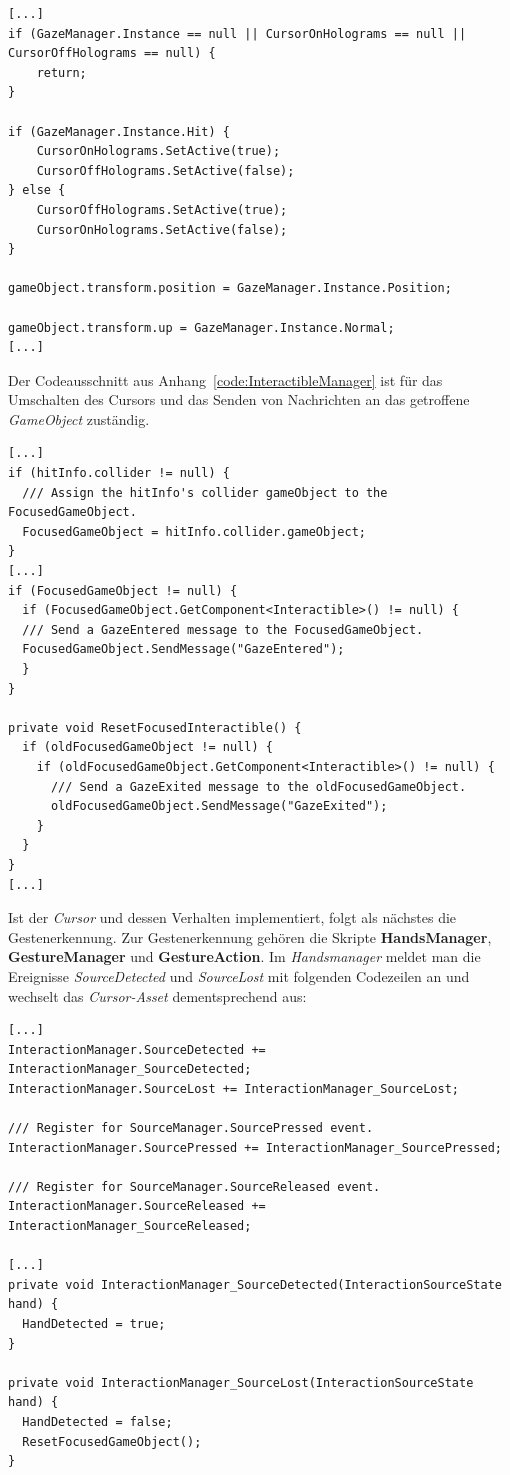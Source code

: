 \begin{lstlisting}
[...]
if (GazeManager.Instance == null || CursorOnHolograms == null || CursorOffHolograms == null) {
	return;
}

if (GazeManager.Instance.Hit) {
	CursorOnHolograms.SetActive(true);
	CursorOffHolograms.SetActive(false);
} else {
	CursorOffHolograms.SetActive(true);
	CursorOnHolograms.SetActive(false);
}
	
gameObject.transform.position = GazeManager.Instance.Position;
	
gameObject.transform.up = GazeManager.Instance.Normal;
[...]
\end{lstlisting}
Der Codeausschnitt aus Anhang~\ref{code:InteractibleManager} ist für das Umschalten des Cursors und das Senden von Nachrichten an das getroffene \textit{GameObject} zuständig.
\begin{lstlisting}
[...]
if (hitInfo.collider != null) {
  /// Assign the hitInfo's collider gameObject to the FocusedGameObject.
  FocusedGameObject = hitInfo.collider.gameObject;
}
[...]
if (FocusedGameObject != null) {
  if (FocusedGameObject.GetComponent<Interactible>() != null) {
  /// Send a GazeEntered message to the FocusedGameObject.
  FocusedGameObject.SendMessage("GazeEntered");
  }
}

private void ResetFocusedInteractible() {
  if (oldFocusedGameObject != null) {
	if (oldFocusedGameObject.GetComponent<Interactible>() != null) {
	  /// Send a GazeExited message to the oldFocusedGameObject.
	  oldFocusedGameObject.SendMessage("GazeExited");
	}
  }
}
[...]
\end{lstlisting}
Ist der \textit{Cursor} und dessen Verhalten implementiert, folgt als nächstes die Gestenerkennung. Zur Gestenerkennung gehören die Skripte \textbf{HandsManager}, \textbf{GestureManager} und \textbf{GestureAction}. Im \textit{Handsmanager} meldet man die Ereignisse \textit{SourceDetected} und \textit{SourceLost} mit folgenden Codezeilen an und wechselt das \textit{Cursor-Asset} dementsprechend aus:
\begin{lstlisting}
[...]
InteractionManager.SourceDetected += InteractionManager_SourceDetected;
InteractionManager.SourceLost += InteractionManager_SourceLost;

/// Register for SourceManager.SourcePressed event.
InteractionManager.SourcePressed += InteractionManager_SourcePressed;

/// Register for SourceManager.SourceReleased event.
InteractionManager.SourceReleased += InteractionManager_SourceReleased;

[...]
private void InteractionManager_SourceDetected(InteractionSourceState hand) {
  HandDetected = true;
}

private void InteractionManager_SourceLost(InteractionSourceState hand) {
  HandDetected = false;
  ResetFocusedGameObject();
}
\end{lstlisting}
